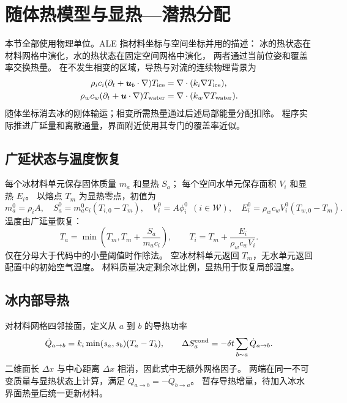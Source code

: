 \section{随体热模型与显热—潜热分配}
\label{sec:thermal}
本节全部使用物理单位。ALE 指材料坐标与空间坐标并用的描述：
冰的热状态在材料网格中演化，水的热状态在固定空间网格中演化，
两者通过当前位姿和覆盖率交换热量。
在不发生相变的区域，导热与对流的连续物理背景为
\begin{align}
 \rho_ic_i(\partial_t+\bm u_b\cdot\nabla)T_{\rm ice}&=\nabla\cdot(k_i\nabla T_{\rm ice}),\\
 \rho_wc_w(\partial_t+\bm u\cdot\nabla)T_{\rm water}&=\nabla\cdot(k_w\nabla T_{\rm water}).
\end{align}
随体坐标消去冰的刚体输运；相变所需热量通过后述局部能量分配扣除。
程序实际推进广延量和离散通量，界面附近使用其专门的覆盖率近似。

\subsection{广延状态与温度恢复}
每个冰材料单元保存固体质量 $m_a$ 和显热 $S_a$；
每个空间水单元保存面积 $V_i$ 和显热 $E_i$。
以熔点 $T_m$ 为显热零点，初值为
\begin{equation}
 m_a^0=\rho_iA,\quad S_a^0=m_a^0c_i(T_{i,0}-T_m),\quad
 V_i^0=A\phi_i^0\ \ (i\in\mathcal W),\quad
 E_i^0=\rho_wc_wV_i^0(T_{w,0}-T_m).
\end{equation}
温度由广延量恢复：
\begin{equation}
 T_a=\min\left(T_m,T_m+\frac{S_a}{m_ac_i}\right),\qquad
 T_i=T_m+\frac{E_i}{\rho_wc_wV_i}.
 \label{eq:temperature}
\end{equation}
仅在分母大于代码中的小量阈值时作除法。
空冰材料单元返回 $T_m$，无水单元返回配置中的初始空气温度。
材料质量决定剩余冰比例，显热用于恢复局部温度。

\subsection{冰内部导热}
对材料网格四邻接面，定义从 $a$ 到 $b$ 的导热功率
\begin{equation}
 \dot Q_{a\to b}=k_i\min(s_a,s_b)(T_a-T_b),\qquad
 \Delta S_a^{\rm cond}=-\delta t\sum_{b\sim a}\dot Q_{a\to b}.
\end{equation}
二维面长 $\Delta x$ 与中心距离 $\Delta x$ 相消，因此式中无额外网格因子。
两端在同一不可变质量与显热状态上计算，满足
$\dot Q_{a\to b}=-\dot Q_{b\to a}$。
 暂存导热增量，待加入冰水界面热量后统一更新材料。

